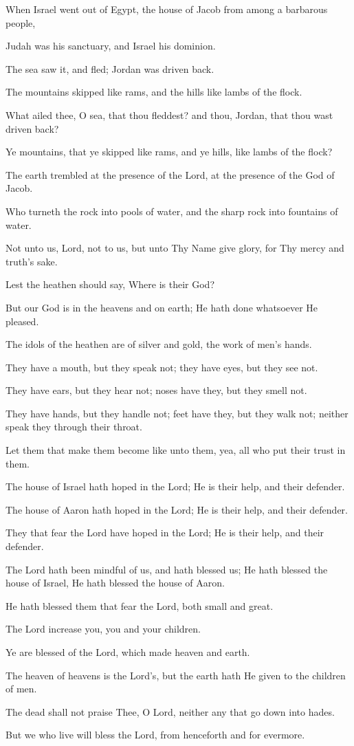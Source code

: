 When Israel went out of Egypt, the house of Jacob from among a barbarous people,

Judah was his sanctuary, and Israel his dominion.

The sea saw it, and fled; Jordan was driven back.

The mountains skipped like rams, and the hills like lambs of the flock.

What ailed thee, O sea, that thou fleddest? and thou, Jordan, that thou wast driven back?

Ye mountains, that ye skipped like rams, and ye hills, like lambs of the flock?

The earth trembled at the presence of the Lord, at the presence of the God of Jacob.

Who turneth the rock into pools of water, and the sharp rock into fountains of water.

Not unto us, Lord, not to us, but unto Thy Name give glory, for Thy mercy and truth’s sake.

Lest the heathen should say, Where is their God?

But our God is in the heavens and on earth; He hath done whatsoever He pleased.

The idols of the heathen are of silver and gold, the work of men’s hands.

They have a mouth, but they speak not; they have eyes, but they see not.

They have ears, but they hear not; noses have they, but they smell not.

They have hands, but they handle not; feet have they, but they walk not; neither speak they through their throat.

Let them that make them become like unto them, yea, all who put their trust in them.

The house of Israel hath hoped in the Lord; He is their help, and their defender.

The house of Aaron hath hoped in the Lord; He is their help, and their defender.

They that fear the Lord have hoped in the Lord; He is their help, and their defender.

The Lord hath been mindful of us, and hath blessed us; He hath blessed the house of Israel, He hath blessed the house of Aaron.

He hath blessed them that fear the Lord, both small and great.

The Lord increase you, you and your children.

Ye are blessed of the Lord, which made heaven and earth.

The heaven of heavens is the Lord's, but the earth hath He given to the children of men.

The dead shall not praise Thee, O Lord, neither any that go down into hades.

But we who live will bless the Lord, from henceforth and for evermore.
